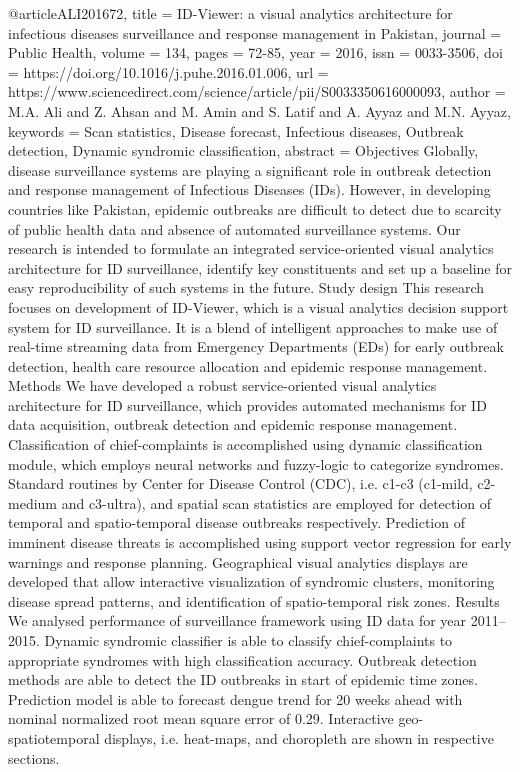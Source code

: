 @article{ALI201672,
title = {ID-Viewer: a visual analytics architecture for infectious diseases surveillance and response management in Pakistan},
journal = {Public Health},
volume = {134},
pages = {72-85},
year = {2016},
issn = {0033-3506},
doi = {https://doi.org/10.1016/j.puhe.2016.01.006},
url = {https://www.sciencedirect.com/science/article/pii/S0033350616000093},
author = {M.A. Ali and Z. Ahsan and M. Amin and S. Latif and A. Ayyaz and M.N. Ayyaz},
keywords = {Scan statistics, Disease forecast, Infectious diseases, Outbreak detection, Dynamic syndromic classification},
abstract = {Objectives
Globally, disease surveillance systems are playing a significant role in outbreak detection and response management of Infectious Diseases (IDs). However, in developing countries like Pakistan, epidemic outbreaks are difficult to detect due to scarcity of public health data and absence of automated surveillance systems. Our research is intended to formulate an integrated service-oriented visual analytics architecture for ID surveillance, identify key constituents and set up a baseline for easy reproducibility of such systems in the future.
Study design
This research focuses on development of ID-Viewer, which is a visual analytics decision support system for ID surveillance. It is a blend of intelligent approaches to make use of real-time streaming data from Emergency Departments (EDs) for early outbreak detection, health care resource allocation and epidemic response management.
Methods
We have developed a robust service-oriented visual analytics architecture for ID surveillance, which provides automated mechanisms for ID data acquisition, outbreak detection and epidemic response management. Classification of chief-complaints is accomplished using dynamic classification module, which employs neural networks and fuzzy-logic to categorize syndromes. Standard routines by Center for Disease Control (CDC), i.e. c1-c3 (c1-mild, c2-medium and c3-ultra), and spatial scan statistics are employed for detection of temporal and spatio-temporal disease outbreaks respectively. Prediction of imminent disease threats is accomplished using support vector regression for early warnings and response planning. Geographical visual analytics displays are developed that allow interactive visualization of syndromic clusters, monitoring disease spread patterns, and identification of spatio-temporal risk zones.
Results
We analysed performance of surveillance framework using ID data for year 2011–2015. Dynamic syndromic classifier is able to classify chief-complaints to appropriate syndromes with high classification accuracy. Outbreak detection methods are able to detect the ID outbreaks in start of epidemic time zones. Prediction model is able to forecast dengue trend for 20 weeks ahead with nominal normalized root mean square error of 0.29. Interactive geo-spatiotemporal displays, i.e. heat-maps, and choropleth are shown in respective sections.
}}
